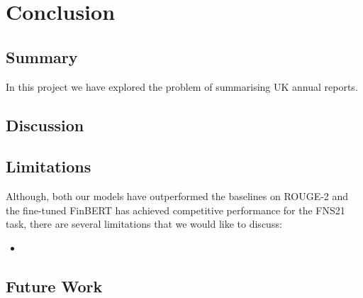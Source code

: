 \section{Conclusion}\label{sec:conclusion}
\subsection{Summary}\label{subsec:summary}
In this project we have explored the problem of summarising UK annual reports.


\subsection{Discussion}\label{subsec:discussion}

\subsection{Limitations}\label{subsec:limitations}
Although, both our models have outperformed the baselines on ROUGE-2 and the fine-tuned FinBERT has achieved competitive performance for the FNS21 task, there are several limitations that we would like to discuss:
\begin{itemize}
    \item
\end{itemize}

\subsection{Future Work}\label{subsec:future-work}
